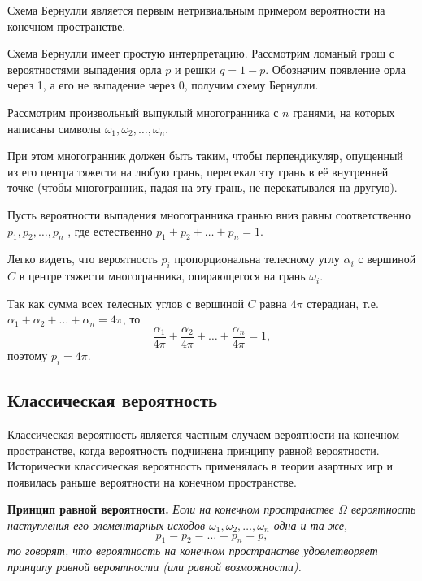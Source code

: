 Схема Бернулли является первым нетривиальным примером вероятности на конечном пространстве.

Схема Бернулли имеет простую интерпретацию. Рассмотрим ломаный грош с вероятностями выпадения орла $p$ и решки $q = 1 − p$. Обозначим появление орла через 1, а его не выпадение через 0, получим схему Бернулли.

\begin{example}
	\label{ex:4.9}
Рассмотрим произвольный выпуклый многогранника с $n$ гранями, на которых написаны символы $\omega_1 , \omega_2 , \ldots , \omega_n$.

При этом многогранник должен быть таким, чтобы перпендикуляр, опущенный из его центра тяжести на любую грань, пересекал эту грань в её внутренней точке (чтобы многогранник, падая на эту грань, не перекатывался на другую).

Пусть вероятности выпадения многогранника гранью вниз равны соответственно $p_1 , p_2 , \ldots , p_n$ , где естественно $p_1 + p_2 + \ldots +p_n = 1$. 

Легко видеть, что вероятность $p_i$ пропорциональна телесному углу $\alpha_i$ с вершиной $C$ в центре тяжести многогранника, опирающегося на грань $\omega_i$.

Так как сумма всех телесных углов с вершиной $C$ равна $4\pi$ стерадиан, т.е. $\alpha_1 + \alpha_2 + \ldots + \alpha_n = 4\pi$, то
$$\frac{\alpha_1}{4\pi} + \frac{\alpha_2}{4\pi} + \ldots + \frac{\alpha_n}{4\pi}
 = 1,$$ поэтому $p_i = 4\pi$.
\end{example}

\subsection{Классическая вероятность}

Классическая вероятность является частным случаем вероятности на конечном пространстве, когда вероятность подчинена принципу равной вероятности. Исторически классическая вероятность применялась в теории азартных игр и появилась раньше вероятности на конечном пространстве.

\textbf{Принцип равной вероятности.} \textit{Если на конечном пространстве $\Omega$ вероятность наступления его элементарных исходов $\omega_1 , \omega_2 , \ldots , \omega_n$ одна и та же,
$$p_1 = p_2 = \ldots = p_n = p,$$
то говорят, что вероятность на конечном пространстве удовлетворяет
принципу равной вероятности (или равной возможности).}

